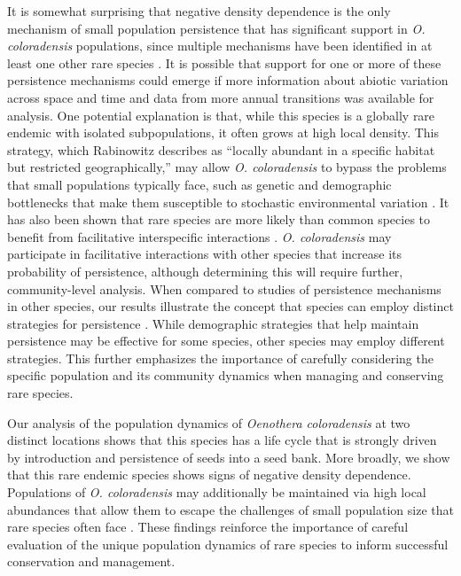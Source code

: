 \documentclass[12pt, letterpaper]{article}
\begin{document}
It is somewhat surprising that negative density dependence is the only mechanism of small population persistence that has significant support in \textit{O. coloradensis} populations, since multiple mechanisms have been identified in at least one other rare species \cite{Dibner2019}. It is possible that support for one or more of these persistence mechanisms could emerge if more information about abiotic variation across space and time and data from more annual transitions was available for analysis. One potential explanation is that, while this species is a globally rare endemic with isolated subpopulations, it often grows at high local density. This strategy, which Rabinowitz describes as “locally abundant in a specific habitat but restricted geographically,” may allow \textit{O. coloradensis} to bypass the problems that small populations typically face, such as genetic and demographic bottlenecks that make them susceptible to stochastic environmental variation \cite{Rabinowitz1981SevenRarity}. It has also been shown that rare species are more likely than common species to benefit from facilitative interspecific interactions \cite{Calatayud2020PositiveAssemblages}. \textit{O. coloradensis} may participate in facilitative interactions with other species that increase its probability of persistence, although determining this will require further, community-level analysis. When compared to studies of persistence mechanisms in other species, our results illustrate the concept that species can employ distinct strategies for persistence \cite{Rabinowitz1981SevenRarity}. While demographic strategies that help maintain persistence may be effective for some species, other species may employ different strategies. This further emphasizes the importance of carefully considering the specific population and its community dynamics when managing and conserving rare species.  

Our analysis of the population dynamics of \textit{Oenothera coloradensis} at two distinct locations shows that this species has a life cycle that is strongly driven by introduction and persistence of seeds into a seed bank. More broadly, we show that this rare endemic species shows signs of negative density dependence. Populations of \textit{O. coloradensis} may additionally be maintained via high local abundances that allow them to escape the challenges of small population size that rare species often face \cite{Rabinowitz1981SevenRarity}. These findings reinforce the importance of careful evaluation of the unique population dynamics of rare species to inform successful conservation and management.  
\end{document}
